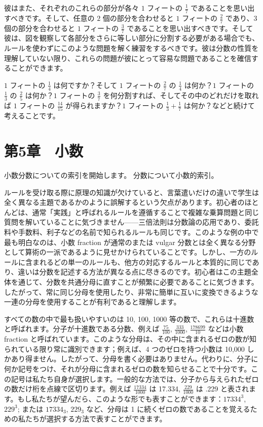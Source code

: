 \documentclass[a4paper,11pt,openany]{ltjsbook}
\begin{document}
彼はまた、それぞれのこれらの部分が各々 $1$ フィートの $\frac{1}{7}$ であることを思い出すべきです。そして、任意の $2$ 個の部分を合わせると $1$ フィートの $\frac{2}{7}$ であり、$3$ 個の部分を合わせると $1$ フィートの $\frac{3}{7}$ であることを思い出すべきです。そして彼は、図を観察して各部分をさらに等しい部分に分割する必要がある場合でも、ルールを使わずにこのような問題を解く練習をするべきです。彼は分数の性質を理解していない限り、これらの問題が彼にとって容易な問題であることを確信することができます。

$1$ フィートの $\frac{1}{4}$ は何ですか？そして $1$ フィートの $\frac{2}{7}$ の $\frac{1}{4}$ は何か？$1$ フィートの $\frac{1}{3}$ の $\frac{2}{5}$ は何か？$1$ フィートの $\frac{3}{7}$ を何分割すれば、そしてその中のどれだけを取れば $1$ フィートの $\frac{14}{15}$ が得られますか？$1$ フィートの $\frac{1}{3} + \frac{1}{7}$ は何か？などと続けて考えることです。

\chapter{第5章　小数}

小数分数についての索引を開始します。
分数について小数的索引。

ルールを受け取る際に原理の知識が欠けていると、言葉遣いだけの違いで学生は全く異なる主題であるかのように誤解するという欠点があります。初心者のほとんどは、通常「実践」と呼ばれるルールを遵循することで複雑な乗算問題と同じ質問を解いていることに気づきません——三倍法則は分数論の応用であり、委託料や手数料、利子などの名前で知られるルールも同じです。このような例の中で最も明白なのは、小数 fraction が通常のまたは vulgar 分数とは全く異なる分野として算術の一派であるように見せかけられていることです。しかし、一方のルールに含まれるどの単一のルールも、他方の対応するルールと本質的に同じであり、違いは分数を記述する方法が異なる点に尽きるのです。初心者はこの主題全体を通じて、分数を共通分母に直すことが頻繁に必要であることに気づきます。したがって、常に同じ分母を使用したり、非常に簡単に互いに変換できるような一連の分母を使用することが有利であると理解します。

すべての数の中で最も扱いやすいのは 10, 100, 1000 等の数で、これらは十進数と呼ばれます。分子が十進数である分数、例えば $\frac{75}{100}$, $\frac{333}{1000}$, $\frac{178699}{10}$ などは小数 fraction と呼ばれています。このような分母は、その中に含まれるゼロの数が知られている限り常に識別できます；例えば、4 つのゼロを持つ小数は 10,000 しかあり得ません。したがって、分母を書く必要はありません。代わりに、分子に何か記号をつけ、それが分母に含まれるゼロの数を知らせることで十分です。この記号は私たち自身が選択します。一般的な方法では、分子から与えられたゼロの数だけ桁を点線で区切ります。例えば $\frac{17334}{1000}$ は 17.334, $\frac{229}{1000}$ は .229 と表されます。もし私たちが望んだら、このような形でも表すことができます：$17334^{3}$, $229^{3}$; または $17334_{3}$, $229_{3}$ など、分母は 1 に続くゼロの数であることを覚えるための私たちが選択する方法で表すことができます。
\end{document}
